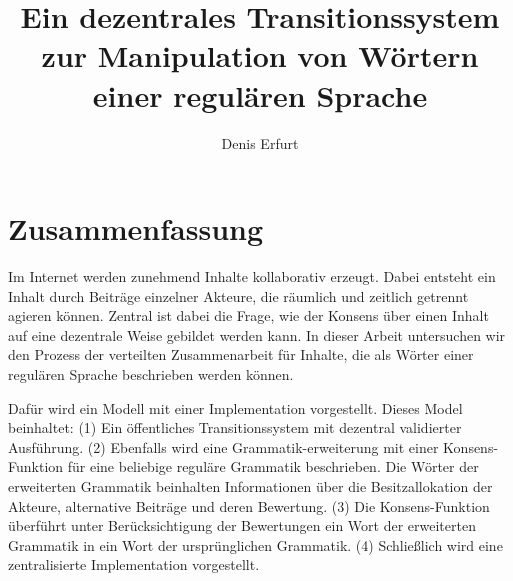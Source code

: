 \documentclass[a4paper,12pt]{report}
\author{Denis Erfurt}
\date{\now}
\title{Ein dezentrales Transitionssystem zur Manipulation von Wörtern einer regulären Sprache}
\begin{document}







\section*{Zusammenfassung}


% 
% 
% 







Im Internet werden zunehmend Inhalte kollaborativ erzeugt. 
Dabei entsteht ein Inhalt durch Beiträge einzelner Akteure, die räumlich und zeitlich getrennt agieren können.
Zentral ist dabei die Frage, wie der Konsens über einen Inhalt auf eine dezentrale Weise gebildet werden kann.
In dieser Arbeit untersuchen wir den Prozess der verteilten Zusammenarbeit für Inhalte, die als Wörter einer regulären Sprache beschrieben werden können. 

Dafür wird ein Modell mit einer Implementation vorgestellt. Dieses Model beinhaltet: 
(1) Ein öffentliches Transitionssystem mit dezentral validierter Ausführung. 
(2) Ebenfalls wird eine Grammatik-erweiterung mit einer Konsens-Funktion für eine beliebige reguläre Grammatik beschrieben. Die Wörter der erweiterten Grammatik beinhalten Informationen über die Besitzallokation der Akteure, alternative Beiträge und deren Bewertung. 
(3) Die Konsens-Funktion überführt unter Berücksichtigung der Bewertungen ein Wort der erweiterten Grammatik in ein Wort der ursprünglichen Grammatik. (4) Schließlich wird eine zentralisierte Implementation vorgestellt.
\end{document}
